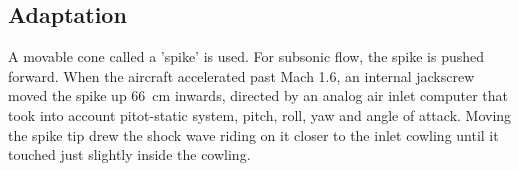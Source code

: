 \documentclass[class=report, crop=false, 12pt,a4paper]{standalone}
\begin{document}
\subsection{Adaptation}
A movable cone called a 'spike' is used. For subsonic flow, the spike is pushed forward. When the aircraft accelerated past Mach 1.6, an internal jackscrew moved the spike up \SI{66}{\centi\meter} inwards, directed by an analog air inlet computer that took into account pitot-static system, pitch, roll, yaw and angle of attack. Moving the spike tip drew the shock wave riding on it closer to the inlet cowling until it touched just slightly inside the cowling.
\end{document}
